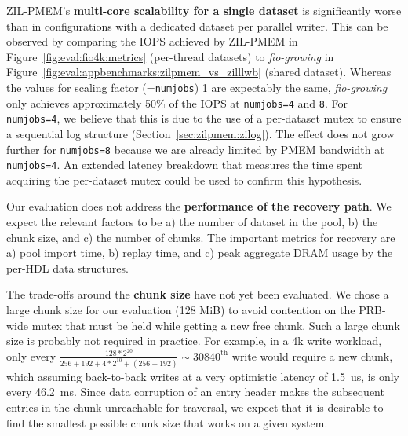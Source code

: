 \documentclass[12pt,a4paper,twoside]{book}
\begin{document}
ZIL-PMEM's \textbf{multi-core scalability for a single dataset} is significantly worse than in configurations with a dedicated dataset per parallel writer.
This can be observed by comparing the IOPS achieved by ZIL-PMEM in Figure~\ref{fig:eval:fio4k:metrics} (per-thread datasets) to \textit{fio-growing} in Figure~\ref{fig:eval:appbenchmarks:zilpmem_vs_zilllwb} (shared dataset).
Whereas the values for scaling factor (=\lstinline{numjobs}) 1 are expectably the same, \textit{fio-growing} only achieves approximately 50\% of the IOPS at \lstinline{numjobs=4} and \lstinline{8}.
For \lstinline{numjobs=4}, we believe that this is due to the use of a per-dataset mutex to ensure a sequential log structure (Section~\ref{sec:zilpmem:zilog}).
The effect does not grow further for \lstinline{numjobs=8} because we are already limited by PMEM bandwidth at \lstinline{numjobs=4}.
An extended latency breakdown that measures the time spent acquiring the per-dataset mutex could be used to confirm this hypothesis.

Our evaluation does not address the \textbf{performance of the recovery path}.
We expect the relevant factors to be a) the number of dataset in the pool, b) the chunk size, and c) the number of chunks.
The important metrics for recovery are a) pool import time, b) replay time, and c) peak aggregate DRAM usage by the per-HDL data structures.

The trade-offs around the \textbf{chunk size} have not yet been evaluated.
We chose a large chunk size for our evaluation (128 MiB) to avoid contention on the PRB-wide mutex that must be held while getting a new free chunk.
Such a large chunk size is probably not required in practice.
For example, in a 4k write workload, only every $\frac{128 * 2^{20}}{256 + 192 + 4*2^{10} + (256 - 192)} \sim 30840^\text{th}$ write would require a new chunk, which assuming back-to-back writes at a very optimistic latency of 1.5~us, is only every 46.2~ms.
Since data corruption of an entry header makes the subsequent entries in the chunk unreachable for traversal, we expect that it is desirable to find the smallest possible chunk size that works on a given system.
\end{document}
